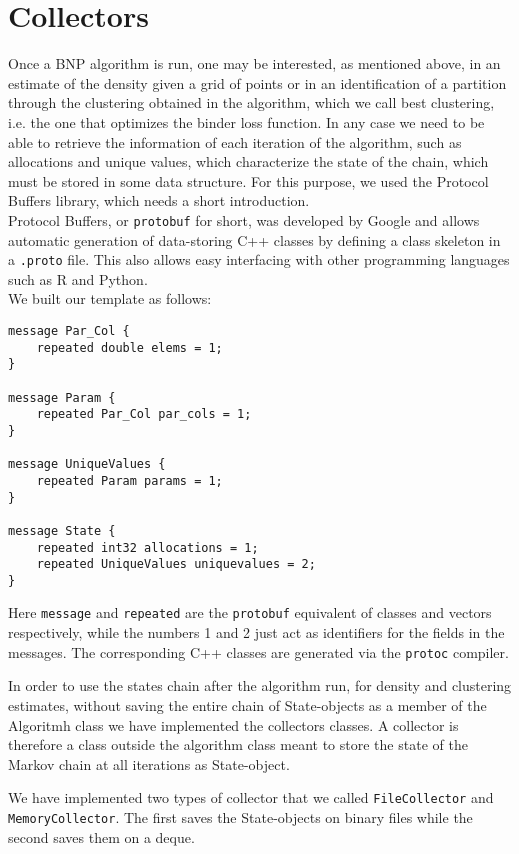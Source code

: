 \section{Collectors}

Once a BNP algorithm is run, one may be interested, as mentioned above, in an estimate of the density given a grid of points or in an identification of a partition through the clustering obtained in the algorithm, which we call best clustering, i.e. the one that optimizes the binder loss function. In any case we need to be able to retrieve the information of each iteration of the algorithm, such as allocations and unique values, which characterize the state of the chain, which must be stored in some data structure.
For this purpose, we used the Protocol Buffers library, which needs a short introduction. \\
Protocol Buffers, or \verb|protobuf| for short, was developed by Google and allows automatic generation of data-storing C++ classes by defining a class skeleton in a \verb|.proto| file.
This also allows easy interfacing with other programming languages such as R and Python. \\
We built our template as follows:
\begin{verbatim}
message Par_Col {
    repeated double elems = 1;
}

message Param {
    repeated Par_Col par_cols = 1;
}

message UniqueValues {
    repeated Param params = 1;
}

message State {
    repeated int32 allocations = 1;
    repeated UniqueValues uniquevalues = 2;
}
\end{verbatim}
Here \verb|message| and \verb|repeated| are the \verb|protobuf| equivalent of classes and vectors respectively, while the numbers 1 and 2 just act as identifiers for the fields in the messages.
The corresponding C++ classes are generated via the \verb|protoc| compiler.


In order to use the states chain after the algorithm run, for density and clustering estimates, without saving the entire chain of State-objects as a member of the Algoritmh class we have implemented the collectors classes. 
A collector is therefore a class outside the algorithm class meant to store the state of the Markov chain at all iterations as State-object.


We have implemented two types of collector that we called \verb|FileCollector| and \verb|MemoryCollector|.
The first saves the State-objects on binary files while the second saves them on a deque.


